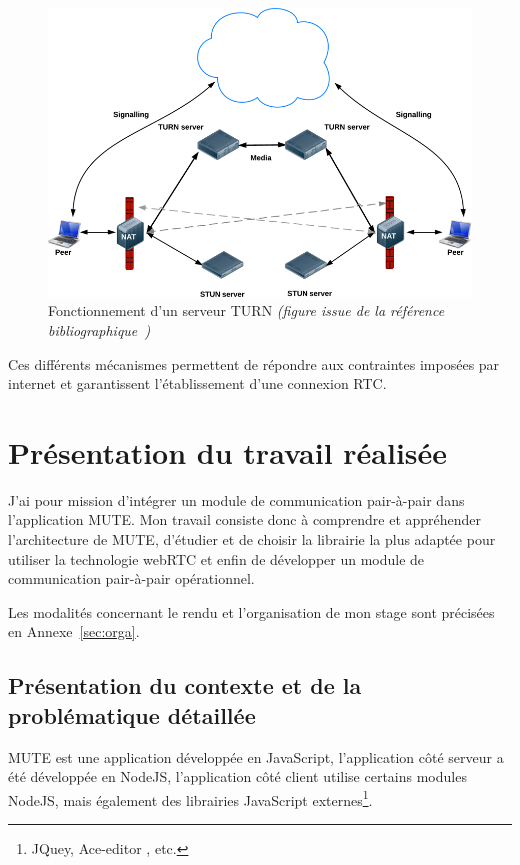 \documentclass{tnreport}
\begin{document}
\begin{figure}[!h]
  \centering
  \includegraphics[width=14cm]{figures/turn}
  \caption{Fonctionnement d'un serveur TURN \emph{(figure issue de la référence bibliographique~\cite{GettingStartedwithWebRTC})}}
  \label{fig:turn}
\end{figure}

Ces différents mécanismes permettent de répondre aux contraintes imposées par internet et garantissent l'établissement d'une connexion RTC. 

\cleardoublepage

\chapter{Présentation du travail réalisée}

J'ai pour mission d'intégrer un module de communication pair-à-pair dans l'application MUTE. Mon travail consiste donc à comprendre et appréhender l'architecture de MUTE, d'étudier et de choisir la librairie la plus adaptée pour utiliser la technologie webRTC et enfin de développer un module de communication pair-à-pair opérationnel.

Les modalités concernant le rendu et l'organisation de mon stage sont précisées en Annexe~\ref{sec:orga}.

\section{Présentation du contexte et de la problématique détaillée}

MUTE est une application développée en JavaScript, l'application côté serveur a été développée en NodeJS, l'application côté client utilise certains modules NodeJS, mais également des librairies JavaScript externes\footnote{JQuey, Ace-editor , etc.}.
\end{document}
